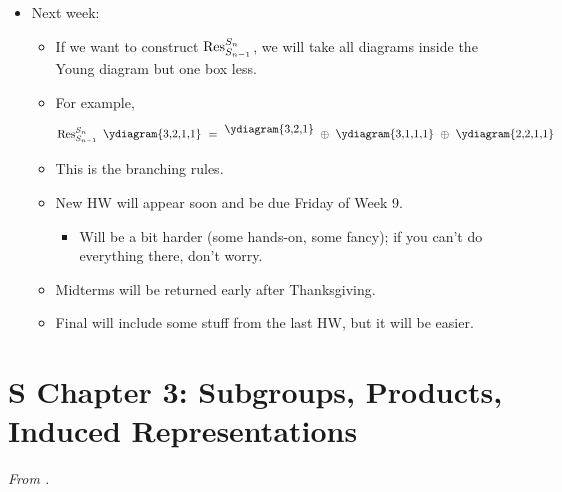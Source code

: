 \documentclass[../notes.tex]{subfiles}
\begin{document}
\begin{itemize}
    \item Next week:
    \begin{itemize}
        \item If we want to construct $\operatorname{Res}_{S_{n-1}}^{S_n}$, we will take all diagrams inside the Young diagram but one box less.
        \item For example,
        \begin{equation*}
            \res_{S_{n-1}}^{S_n}\tikz[baseline={(0,-0.1)}]{\node{\ydiagram{3,2,1,1}};}
            = \tikz[baseline={(0,-0.25)}]{\node{\ydiagram{3,2,1}};}
            \oplus\tikz[baseline={(0,-0.1)}]{\node{\ydiagram{3,1,1,1}};}
            \oplus\tikz[baseline={(0,-0.1)}]{\node{\ydiagram{2,2,1,1}};}
        \end{equation*}
        \item This is the branching rules.
        \item New HW will appear soon and be due Friday of Week 9.
        \begin{itemize}
            \item Will be a bit harder (some hands-on, some fancy); if you can't do everything there, don't worry.
        \end{itemize}
        \item Midterms will be returned early after Thanksgiving.
        \item Final will include some stuff from the last HW, but it will be easier.
    \end{itemize}
\end{itemize}



\section{S Chapter 3: Subgroups, Products, Induced Representations}
\emph{From \textcite{bib:Serre}.}
\setcounter{theorem}{8}
\end{document}
